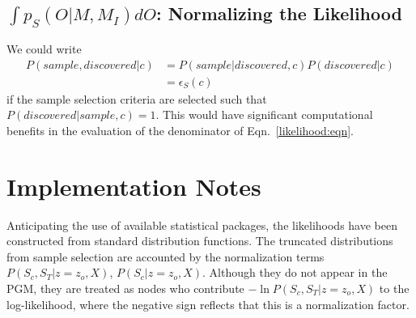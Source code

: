 \documentclass[preprint,3p]{elsarticle}
\begin{document}

\subsection{$\int  p_S(O|M, M_I)dO$: Normalizing the Likelihood}
We could write
\begin{align*}
P(sample, discovered |c) & =P(sample| discovered, c)P(discovered |c)\\
&= \epsilon_S(c)
\end{align*}
if the sample selection criteria are selected such that $P(discovered | sample, c)=1$.
This would have significant
computational benefits in the evaluation of the denominator of Eqn.~\ref{likelihood:eqn}.

\section{Implementation Notes}
Anticipating the use of available statistical packages, the likelihoods have been constructed
from standard distribution functions.  The truncated distributions from sample selection
are accounted by the normalization 
terms $P(S_c, S_T| z=z_o, X)$, $P(S_c| z=z_o, X)$.  Although they do not appear
in the PGM, they are treated as nodes who contribute 
$-\ln{P(S_c, S_T| z=z_o, X)}$ to the log-likelihood, where the negative sign reflects that this is a normalization
factor.
\end{document}
